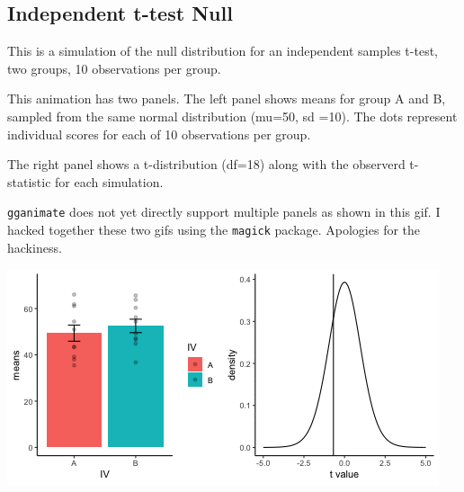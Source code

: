 \documentclass[
]{book}
\begin{document}
\hypertarget{independent-t-test-null}{%
\subsection{Independent t-test Null}\label{independent-t-test-null}}

This is a simulation of the null distribution for an independent samples t-test, two groups, 10 observations per group.

This animation has two panels. The left panel shows means for group A and B, sampled from the same normal distribution (mu=50, sd =10). The dots represent individual scores for each of 10 observations per group.

The right panel shows a t-distribution (df=18) along with the observerd t-statistic for each simulation.

\texttt{gganimate} does not yet directly support multiple panels as shown in this gif. I hacked together these two gifs using the \texttt{magick} package. Apologies for the hackiness.

\includegraphics{gifs/indTtest.gif}
\end{document}
